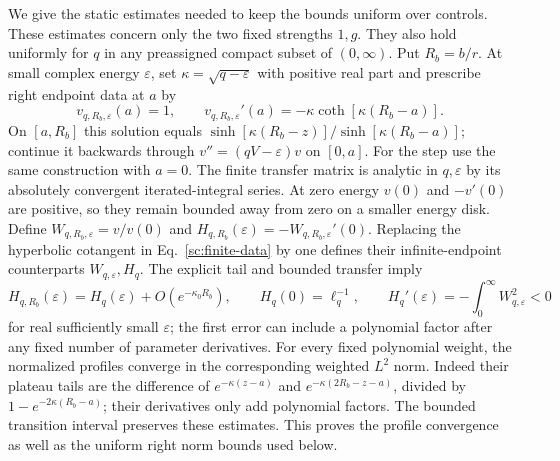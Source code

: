 \documentclass[aps,prl,reprint,superscriptaddress,longbibliography]{revtex4-2}
\begin{document}
We give the static estimates needed to keep the bounds uniform over
controls. These estimates concern only the two fixed strengths $1,g$.
They also hold uniformly for $q$ in any preassigned compact subset of
$(0,\infty)$. Put $R_b=b/r$. At small complex energy $\varepsilon$,
set $\kappa=\sqrt{q-\varepsilon}$ with positive real part and prescribe
right endpoint data at $a$ by
\begin{equation}
 v_{q,R_b,\varepsilon}(a)=1,\qquad
 v_{q,R_b,\varepsilon}'(a)
 =-\kappa\coth[\kappa(R_b-a)].
 \label{sc:finite-data}
\end{equation}
On $[a,R_b]$ this solution equals
$\sinh[\kappa(R_b-z)]/\sinh[\kappa(R_b-a)]$; continue it backwards
through $v''=(qV-\varepsilon)v$ on $[0,a]$. For the step use the same
construction with $a=0$. The finite transfer matrix is analytic in
$q,\varepsilon$ by its absolutely convergent iterated-integral series.
At zero energy $v(0)$ and $-v'(0)$ are positive, so they remain bounded
away from zero on a smaller energy disk. Define
$W_{q,R_b,\varepsilon}=v/v(0)$ and
$H_{q,R_b}(\varepsilon)=-W_{q,R_b,\varepsilon}'(0)$.
Replacing the hyperbolic cotangent in Eq.~\eqref{sc:finite-data} by one
defines their infinite-endpoint counterparts $W_{q,\varepsilon},H_q$.
The explicit tail and bounded transfer imply
\begin{equation}
 H_{q,R_b}(\varepsilon)=H_q(\varepsilon)+O(e^{-\kappa_0R_b}),
 \qquad H_q(0)=\ell_q^{-1},\qquad
 H_q'(\varepsilon)=-\int_0^\infty W_{q,\varepsilon}^2<0
 \label{sc:H-estimates}
\end{equation}
for real sufficiently small $\varepsilon$; the first error can include
a polynomial factor after any fixed number of parameter derivatives.
For every fixed polynomial weight, the normalized profiles converge in
the corresponding weighted $L^2$ norm. Indeed their plateau tails are
the difference of $e^{-\kappa(z-a)}$ and
$e^{-\kappa(2R_b-z-a)}$, divided by $1-e^{-2\kappa(R_b-a)}$;
their derivatives only add polynomial factors. The bounded transition
interval preserves these estimates. This proves the profile convergence
as well as the uniform right norm bounds used below.
\end{document}
